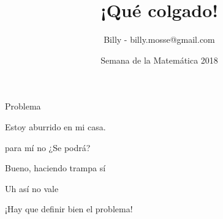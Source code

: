 \documentclass[11pt]{beamer}
\begin{document}
\title{¡Qué colgado!}
\date{Semana de la Matemática 2018}
\author{Billy - billy.mosse@gmail.com}


\begin{frame}
\maketitle
\end{frame}


\begin{frame}{Problema}

	Estoy aburrido en mi casa.
	\bigskip
	
	\bigskip
	
	\bigskip
	
	
	
\end{frame}

\begin{frame}{para mí no}
	\huge{¿Se podrá?}
\end{frame}


\begin{frame}{Bueno, haciendo trampa sí}
	
\end{frame}

\begin{frame}{Uh así no vale}


\huge{¡Hay que definir bien el problema!}

\end{frame}
\end{document}
